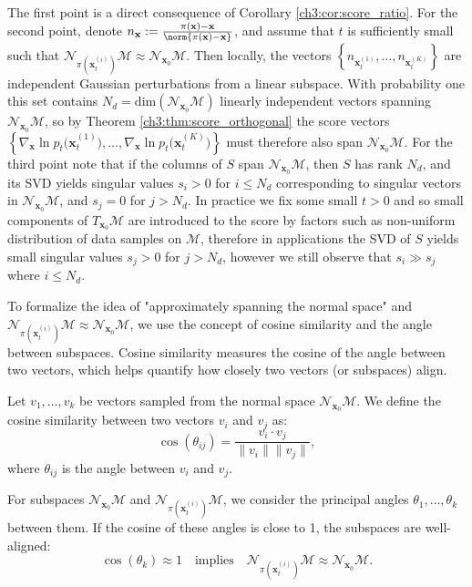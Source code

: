The first point is a direct consequence of Corollary \ref{ch3:cor:score_ratio}. For the second point, denote $n_\textbf{x}:=\frac{\pi(\textbf{x})-\textbf{x}}{\norm{\pi(\textbf{x})-\textbf{x}}}$, and assume that $t$ is sufficiently small such that $\mathcal{N}_{\pi(\textbf{x}_t^{(i)})}\mathcal{M} \approx \mathcal{N}_{\textbf{x}_0}\mathcal{M}$. Then locally, the vectors $\left\{n_{\textbf{x}_t^{(1)}},\dots,n_{\textbf{x}_t^{(K)}} \right\}$ are independent Gaussian perturbations from a linear subspace. With probability one this set contains $N_d = \text{dim}(\mathcal{N}_{\textbf{x}_0}\mathcal{M})$ linearly independent vectors spanning $\mathcal{N}_{\textbf{x}_0}\mathcal{M}$, so by Theorem \ref{ch3:thm:score_orthogonal} the score vectors  $\left\{ \nabla_{\textbf{x}} \ln p_t\big(\textbf{x}_t^{(1)}\big),\dots, \nabla_{\textbf{x}} \ln p_t\big(\textbf{x}_t^{(K)}\big) \right\}$ must therefore also span $\mathcal{N}_{\textbf{x}_0}\mathcal{M}$. For the third point note that if the columns of $S$ span $\mathcal{N}_{\textbf{x}_0}\mathcal{M}$, then $S$ has rank $N_d$, and its SVD yields singular values $s_i>0$ for $i\leq N_d$ corresponding to singular vectors in $\mathcal{N}_{\textbf{x}_0}\mathcal{M}$, and $s_j=0$ for $j>N_d$. In practice we fix some small $t>0$ and so small components of $T_{\textbf{x}_0}\mathcal{M}$ are introduced to the score by factors such as non-uniform distribution of data samples on $\mathcal{M}$, therefore in applications the SVD of $S$ yields small singular values $s_j>0$ for $j>N_d$, however we still observe that $s_i \gg s_j$ where $i \leq N_d$.

To formalize the idea of "approximately spanning the normal space" and $\mathcal{N}_{\pi(\textbf{x}_t^{(i)})}\mathcal{M} \approx \mathcal{N}_{\textbf{x}_0}\mathcal{M}$, we use the concept of cosine similarity and the angle between subspaces. Cosine similarity measures the cosine of the angle between two vectors, which helps quantify how closely two vectors (or subspaces) align.

Let \( v_1, \ldots, v_k \) be vectors sampled from the normal space \(\mathcal{N}_{\textbf{x}_0}\mathcal{M}\). We define the cosine similarity between two vectors \( v_i \) and \( v_j \) as:
\[ \cos(\theta_{ij}) = \frac{v_i \cdot v_j}{\|v_i\| \|v_j\|}, \]
where \(\theta_{ij}\) is the angle between \( v_i \) and \( v_j \).

For subspaces \(\mathcal{N}_{\textbf{x}_0}\mathcal{M}\) and \(\mathcal{N}_{\pi(\textbf{x}_t^{(i)})}\mathcal{M}\), we consider the principal angles \(\theta_1, \ldots, \theta_k\) between them. If the cosine of these angles is close to 1, the subspaces are well-aligned:
\[ \cos(\theta_k) \approx 1 \quad \text{implies} \quad \mathcal{N}_{\pi(\textbf{x}_t^{(i)})}\mathcal{M} \approx \mathcal{N}_{\textbf{x}_0}\mathcal{M}. \]


